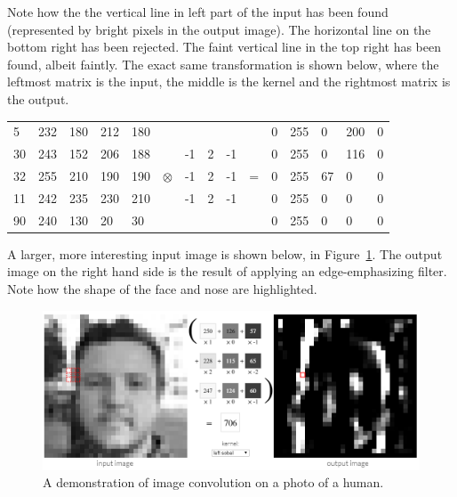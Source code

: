 Note how the the vertical line in left part of the input has been found (represented by bright pixels in the output image). The horizontal line on the bottom right has been rejected. The faint vertical line in the top right has been found, albeit faintly. The exact same transformation is shown below, where the leftmost matrix is the input, the middle is the kernel and the rightmost matrix is the output.



\begin{table}[h!]
	\centering
	\begin{tabular}{ p{0.5cm} p{0.5cm} p{0.5cm} p{0.5cm} p{0.5cm} p{0.5cm} p{0.5cm} p{0.5cm} p{0.5cm} p{0.5cm} p{0.5cm} p{0.5cm} p{0.5cm} p{0.5cm} p{0.5cm}}
 5 & 232 & 180 & 212 & 180 &           &    &   &    &   & 0 & 255 & 0 & 200 & 0 \\
30 & 243 & 152 & 206 & 188 &           & -1 & 2 & -1 &   & 0 & 255 & 0 & 116 & 0 \\
32 & 255 & 210 & 190 & 190 & $\otimes$ & -1 & 2 & -1 & = & 0 & 255 & 67 & 0  & 0 \\
11 & 242 & 235 & 230 & 210 &           & -1 & 2 & -1 &   & 0 & 255 & 0 &  0  & 0 \\
90 & 240 & 130 &  20 &  30 &           &    &   &    &   & 0 & 255 & 0 &  0  & 0
	\end{tabular}
\end{table}

A larger, more interesting input image is shown below, in Figure~\ref{fig:image_kernel_demo}. The output image on the right hand side is the result of applying an edge-emphasizing filter. Note how the shape of the face and nose are highlighted.

\begin{figure}[h!]
  \centering
  \includegraphics[width=\textwidth]{literature_review/image_kernel_demo}
  \caption{\label{fig:image_kernel_demo} A demonstration of image convolution on a photo of a human.}
\end{figure}

